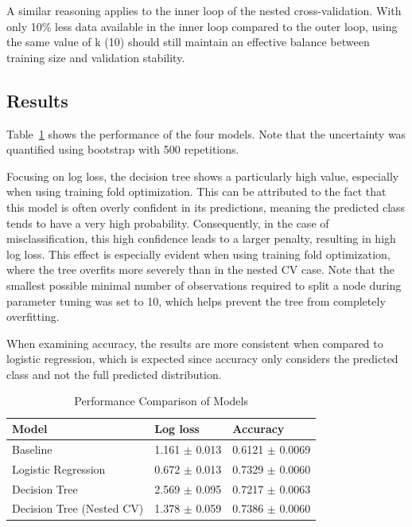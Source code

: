 \documentclass[9pt]{IEEEtran}
\begin{document}
A similar reasoning applies to the inner loop of the nested cross-validation. 
With only 10\% less data available in the inner loop compared to 
the outer loop, using the same value of k (10) should still maintain 
 an effective balance between training size and validation 
stability.

\subsection{Results}
Table~\ref{tab:results} shows the performance of the four models. 
Note that the uncertainty was quantified using bootstrap with 500 repetitions.

Focusing on log loss, the decision tree shows a particularly high value,
 especially when using training fold optimization. This can be attributed
  to the fact that this model is often overly confident in its predictions, 
  meaning the predicted class tends to have a very high probability.
   Consequently, in the case of misclassification, this high confidence
    leads to a larger penalty, resulting in high log loss.
     This effect is especially evident when using training fold 
     optimization, where the tree overfits more severely than in the
      nested CV case. Note that the smallest possible minimal number
       of observations required to split a node during parameter tuning
        was set to 10, which helps prevent the tree from completely 
        overfitting.

When examining accuracy, the results are more consistent when 
compared to logistic regression, which is expected since accuracy only
 considers the predicted class and not the full predicted distribution.



 \begin{table}[h]
    \begin{tabular}{l|l|l}
    Model                           & Log loss& Accuracy          \\
    \hline
    Baseline       & 1.161 $\pm$ 0.013    & 0.6121 $\pm$  0.0069          \\
    Logistic Regression       & 0.672 $\pm$ 0.013 & 0.7329 $\pm$   0.0060               \\
    Decision Tree  &  2.569 $\pm$ 0.095  & 0.7217 $\pm$ 0.0063                \\
    Decision Tree (Nested CV)  &1.378 $\pm$ 0.059 & 0.7386 $\pm$ 0.0060  
    \end{tabular}
    \vspace{2px}
    \caption{Performance Comparison of Models}
    \label{tab:results}
\end{table}
\end{document}
